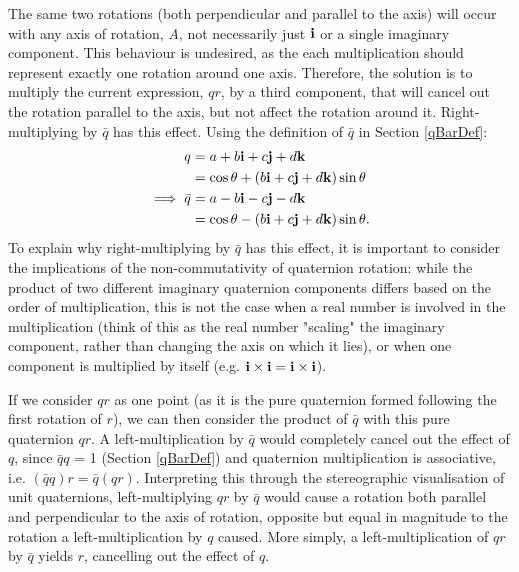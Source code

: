 \documentclass[10pt]{article}
\begin{document}
The same two rotations (both perpendicular and parallel to the axis) will occur with any axis of rotation, $A$, not necessarily just $\vb{i}$ or a single imaginary component. This behaviour is undesired, as the each multiplication should represent exactly one rotation around one axis. Therefore, the solution is to multiply the current expression, $qr$, by a third component, that will cancel out the rotation parallel to the axis, but not affect the rotation around it. Right-multiplying by $\bar{q}$ has this effect. Using the definition of $\bar{q}$ in Section \ref{qBarDef}:
\begin{equation}
    \begin{aligned}
        q &= a + b\vb{i} + c\vb{j} + d\vb{k} \\
          &= \cos\theta + (b\vb{i} + c\vb{j} + d\vb{k})\sin\theta \\
        \implies \bar{q} &= a - b\vb{i} - c\vb{j} - d\vb{k} \\
          &= \cos\theta - (b\vb{i} + c\vb{j} + d\vb{k})\sin\theta.
    \end{aligned}
\end{equation}
To explain why right-multiplying by $\bar{q}$ has this effect, it is important to consider the implications of the non-commutativity of quaternion rotation: while the product of two different imaginary quaternion components differs based on the order of multiplication, this is not the case when a real number is involved in the multiplication (think of this as the real number "scaling" the imaginary component, rather than changing the axis on which it lies), or when one component is multiplied by itself (e.g. $\vb{i}\times\vb{i} = \vb{i}\times\vb{i}$).

If we consider $qr$ as one point (as it is the pure quaternion formed following the first rotation of $r$), we can then consider the product of $\bar{q}$ with this pure quaternion $qr$. A left-multiplication by $\bar{q}$ would completely cancel out the effect of $q$, since $\bar{q}q$ = 1 (Section \ref{qBarDef}) and quaternion multiplication is associative, i.e. $(\bar{q}q)r = \bar{q}(qr)$. Interpreting this through the stereographic visualisation of unit quaternions, left-multiplying $qr$ by $\bar{q}$ would cause a rotation both parallel and perpendicular to the axis of rotation, opposite but equal in magnitude to the rotation a left-multiplication by $q$ caused. More simply, a left-multiplication of $qr$ by $\bar{q}$ yields $r$, cancelling out the effect of $q$.
\end{document}
